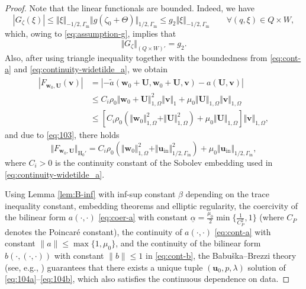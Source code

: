 \documentclass[onefignum,onetabnum,reqno,a4paper,final]{siamart250211}
\def\O{\Omega}
\newcommand\bu{\boldsymbol{u}}
\newcommand\bv{\boldsymbol{v}}
\newcommand\bw{\boldsymbol{w}}
\newcommand\0{\mathbf{0}}
\newcommand\bU{\boldsymbol{U}}
\newcommand\bH{\boldsymbol{\mathrm{H}}}
\renewcommand\O{\Omega}
\newcommand\Gm{\Gamma_{\mathrm{m}}}
\newcommand\Gi{\Gamma_{\mathrm{in}}}
\numberwithin{figure}{section}
\numberwithin{table}{section}
\begin{document}
\begin{proof}
Note that the linear functionals are bounded. Indeed, we have 
$$
	|G_{\zeta}(\xi)|\leq \Vert\xi\Vert_{-1/2,\Gm}\Vert g(\zeta_0+\Theta)\Vert_{1/2,\Gm}\leq g_2\Vert \xi\Vert_{-1/2,\Gm} \qquad \forall (q,\xi)\in Q\times W,
$$
which, owing to \eqref{eq:assumption-g},  implies that 
\begin{equation}
	\label{eq:106}
	\Vert G_{\zeta}\Vert_{(Q\times W)'} = g_2.  
\end{equation}
Also, after using triangle inequality together with the boundedness from \eqref{eq:cont-a} and  \eqref{eq:continuity-widetilde_a}, we obtain 
$$
\begin{aligned}
	|F_{\bw_0,\bU}(\bv)|&= |-\tilde{a}(\bw_0 + \bU, \bw_0 + \bU, \bv) - a(\bU,\bv)|\\
	&\leq C_i\rho_0\Vert \bw_0 +\bU\Vert_{1,\Omega}^ 2\Vert \bv\Vert_1 + \mu_0\Vert \bU\Vert_{1,\O}\Vert \bv\Vert_{1,\O}\\
	&\leq \left[C_i\rho_0\left(\Vert\bw_0\Vert_{1,\O}^ 2 +\Vert \bU\Vert_{1,\O}^2\right) + \mu_0\Vert\bU\Vert_{1,\O} \right]\Vert\bv\Vert_{1,\O},
\end{aligned}
$$
and due to \eqref{eq:103}, there holds 
$$
\Vert F_{\bw_0,\bU}\Vert_{\bH_0'}=C_i\rho_0\left(\Vert\bw_0\Vert_{1,\O}^ 2 +\Vert \bu_{\mathrm{in}}\Vert_{1/2,\Gi}^2\right) + \mu_0\Vert \bu_{\mathrm{in}}\Vert_{1/2,\Gi},
$$
where $C_i>0$ is the continuity constant of the Sobolev embedding used in \eqref{eq:continuity-widetilde_a}. 

Using Lemma \ref{lem:B-inf} with  inf-sup  constant $\beta$ depending on the trace inequality constant, embedding theorems and elliptic regularity, the coercivity of the bilinear form $a(\cdot,\cdot)$ \eqref{eq:coer-a} with constant $\underline{\alpha} = \frac{\mu_0}{2}\min\{\frac{1}{C_P^2},1\}$  (where $C_P$ denotes the Poincar\'e constant), the continuity of $a(\cdot,\cdot)$ \eqref{eq:cont-a} with constant $\|a \| \leq \max\{1,\mu_0\}$, and the continuity of the bilinear form $b(\cdot,(\cdot,\cdot))$ with constant $\|b\| \leq 1$ in \eqref{eq:cont-b}, the Babu\v{s}ka--Brezzi theory (see, e.g., \cite[Theorem 2.34]{ern2004applied}) guarantees that there exists a unique tuple $(\bu_0,p,\lambda)$ solution of \eqref{eq:104a}--\eqref{eq:104b}, which also satisfies the  continuous dependence on data. 
\end{proof}
\end{document}
